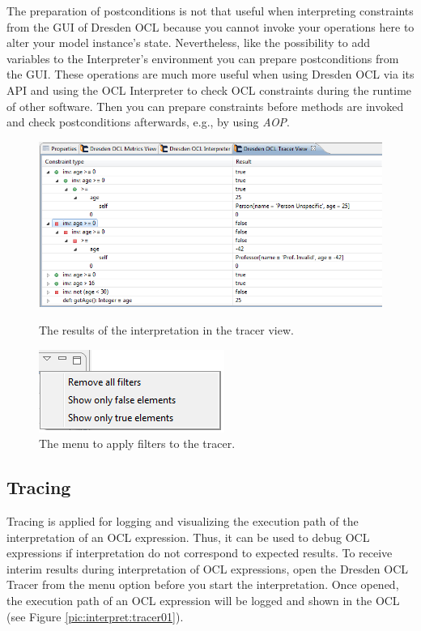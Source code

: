 The preparation of postconditions is not that useful when interpreting 
constraints from the GUI of Dresden OCL because you cannot invoke your 
operations here to alter your model instance's state. Nevertheless, like the 
possibility to add variables to the Interpreter's environment you can prepare 
postconditions from the GUI. These operations are much more useful when using 
Dresden OCL via its API and using the \acs{OCL} Interpreter to check \acs{OCL} 
constraints during the runtime of other software. Then you can prepare
constraints before methods are invoked and check postconditions afterwards, 
e.g., by using \emph{\acf{AOP}}.

\begin{figure}[h]
	\centering
	\includegraphics[width=1.0\linewidth]{figures/interpreter/tracer01.png}
	\caption{The results of the interpretation in the tracer view.}
	\label{pic:interpret:tracer01}

	\vspace{3.0em}	
	
	\centering
	\includegraphics[scale=1]{figures/interpreter/tracer02.png}
	\caption{The menu to apply filters to the tracer.}
	\label{pic:interpret:tracer02}
\end{figure}

\subsection{Tracing}

Tracing is applied for logging and visualizing the execution path of the
interpretation of an \acs{OCL} expression. Thus, it can be used to debug OCL
expressions if interpretation do not correspond to expected results. To receive
interim results during interpretation of \acs{OCL} expressions, open the Dresden
\acs{OCL} Tracer from the menu option  before you start the interpretation. Once opened, the execution path of
an \acs{OCL} expression will be logged and shown in the \acs{OCL}
 (see Figure \ref{pic:interpret:tracer01}).

